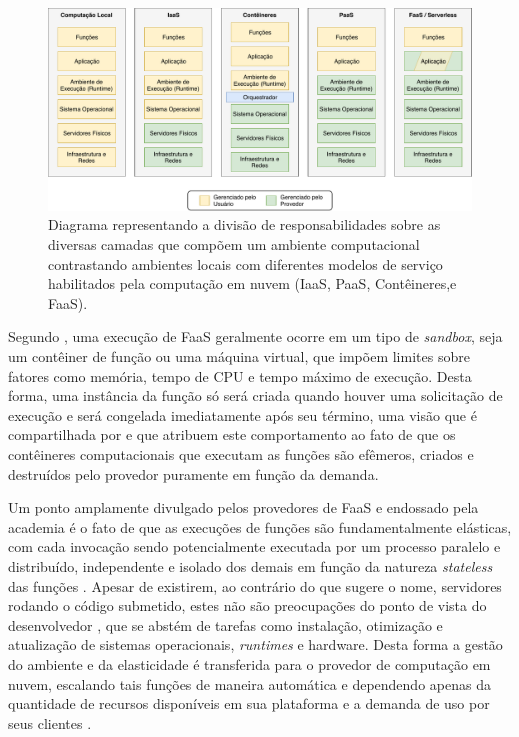 \documentclass[english,brazilian]{UNISINOSmonografia} %
\begin{document}
\begin{figure}[tbp]
\centering%
\begin{minipage}{\textwidth}
	\caption{Diagrama representando a divisão de responsabilidades sobre as diversas camadas que compõem um ambiente computacional contrastando ambientes locais com diferentes modelos de serviço habilitados pela computação em nuvem (IaaS, PaaS, Contêineres,e FaaS).}
	\label{fig:faas}
	\vspace{1ex}
	\includegraphics[clip,width=\textwidth]{mestrado-faas}
\end{minipage}
\end{figure}



Segundo , uma execução de FaaS geralmente ocorre em um tipo de \textit{sandbox}, seja um contêiner de função ou uma máquina virtual, que impõem limites sobre fatores como memória, tempo de CPU e tempo máximo de execução.
Desta forma, uma instância da função só será criada quando houver uma solicitação de execução e será congelada imediatamente após seu término, uma visão que é compartilhada por  e que atribuem este comportamento ao fato de que os contêineres computacionais que executam as funções são efêmeros, criados e destruídos pelo provedor puramente em função da demanda.



Um ponto amplamente divulgado pelos provedores de FaaS e endossado pela academia é o fato de que as execuções de funções são fundamentalmente elásticas, com cada invocação sendo potencialmente executada por um processo paralelo e distribuído, independente e isolado dos demais em função da natureza \textit{stateless} das funções \cite{SpoialaServerless,Jonas2017,FowlerServerless,Jonas2017}.
Apesar de existirem, ao contrário do que sugere o nome, servidores rodando o código submetido, estes não são preocupações do ponto de vista do desenvolvedor \cite{SpoialaServerless}, que se abstém de tarefas como instalação, otimização e atualização de sistemas operacionais, \textit{runtimes} e hardware.
Desta forma a gestão do ambiente e da elasticidade é transferida para o provedor de computação em nuvem, escalando tais funções de maneira automática e dependendo apenas da quantidade de recursos disponíveis em sua plataforma e a demanda de uso por seus clientes \cite{BoweiHan}.
\end{document}
